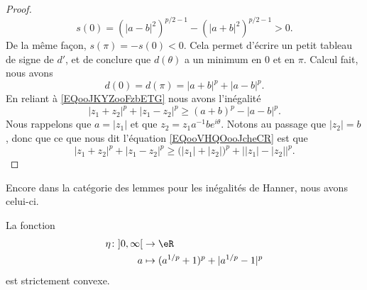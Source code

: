 \begin{proof}
\begin{equation}
			s(0)=\left( | a-b |^2 \right)^{p/2-1}-\left( | a+b |^2 \right)^{p/2-1}>0.
		\end{equation}
		De la même façon, \( s(\pi)=-s(0)<0\). Cela permet d'écrire un petit tableau de signe de \( d'\), et de conclure que \( d(\theta)\) a un minimum en \( 0\) et en \( \pi\). Calcul fait, nous avons
		\begin{equation}
			d(0)=d(\pi)=| a+b |^p+| a-b |^p.
		\end{equation}
		En reliant à \eqref{EQooJKYZooFzbETG} nous avons l'inégalité
		\begin{equation}        \label{EQooVHQOooJcheCR}
			| z_1+z_2 |^p+| z_1-z_2 |^p\geq (a+b)^p-| a-b |^p.
		\end{equation}
		Nous rappelons que \( a=| z_1 |\) et que \( z_2=z_1a^{-1}b e^{i\theta}\). Notons au passage que \( | z_2 |=b\), donc que ce que nous dit l'équation \eqref{EQooVHQOooJcheCR} est que
		\begin{equation}
			| z_1+z_2 |^p+| z_1-z_2 |^p\geq \big( | z_1 |+| z_2 | \big)^p+\big| | z_1 |-| z_2 | \big|^p.
		\end{equation}
	\end{proof}

	Encore dans la catégorie des lemmes pour les inégalités de Hanner, nous avons celui-ci.
	\begin{lemma}     \label{LEMooTCNEooADpNai}
		La fonction
		\begin{equation}
			\begin{aligned}
				\eta\colon \mathopen] 0 , \infty \mathclose[ & \to \eR                               \\
				a                                            & \mapsto (a^{1/p}+1)^p+| a^{1/p}-1 |^p
			\end{aligned}
		\end{equation}
		est strictement convexe.
	\end{lemma}

